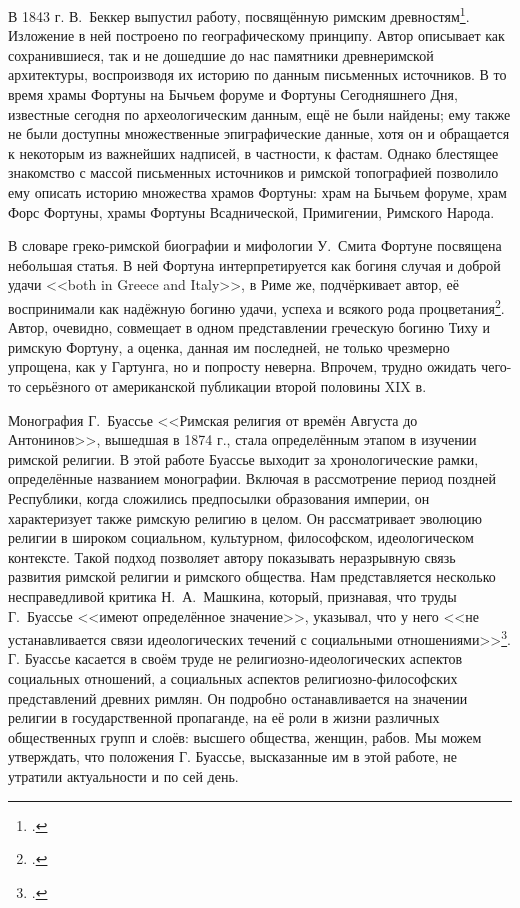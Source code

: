 В 1843 г. В.~Беккер выпустил работу, посвящённую римским древностям\footcite{Becker1843I}. Изложение в ней построено по географическому принципу. Автор описывает как сохранившиеся, так и не дошедшие до нас памятники древнеримской архитектуры, воспроизводя их историю по данным письменных источников. В то время храмы Фортуны на Бычьем форуме и Фортуны Сегодняшнего Дня, известные сегодня по археологическим данным, ещё не были найдены; ему также не были доступны множественные эпиграфические данные, хотя он и обращается к некоторым из важнейших надписей, в частности, к фастам. Однако блестящее знакомство с массой письменных источников и римской топографией позволило ему описать историю множества храмов Фортуны: храм на Бычьем форуме, храм Форс Фортуны, храмы Фортуны Всаднической, Примигении, Римского Народа.


В словаре греко-римской биографии и мифологии У.~Смита Фортуне посвящена небольшая статья. В ней Фортуна интерпретируется как богиня случая и доброй удачи <<both in Greece and Italy>>, в Риме же, подчёркивает автор, её воспринимали как надёжную богиню удачи, успеха и всякого рода процветания\footcite[P. 180]{FortunaSmith1867}. Автор, очевидно, совмещает в одном представлении греческую богиню Тиху и римскую Фортуну, а оценка, данная им последней, не только чрезмерно упрощена, как у Гартунга, но и попросту неверна. Впрочем, трудно ожидать чего-то серьёзного от американской публикации второй половины XIX в.


Монография Г.~Буассье <<Римская религия от времён Августа до Антонинов>>, вышедшая в 1874 г., стала определённым этапом в изучении римской религии. В этой работе Буассье выходит за хронологические рамки, определённые названием монографии. Включая в рассмотрение период поздней Республики, когда сложились предпосылки образования империи, он характеризует также римскую религию в целом. Он рассматривает эволюцию религии в широком социальном, культурном, философском, идеологическом контексте. Такой подход позволяет автору показывать неразрывную связь развития римской религии и римского общества. Нам представляется несколько несправедливой критика Н.~А.~Машкина, который, признавая, что труды Г.~Буассье <<имеют определённое значение>>, указывал, что у него <<не устанавливается связи идеологических течений с социальными отношениями>>\footcite[С. 350]{Mashkin1949}. Г. Буассье касается в своём труде не религиозно-идеологических аспектов социальных отношений, а социальных аспектов религиозно-философских представлений древних римлян. Он подробно останавливается на значении религии в государственной пропаганде, на её роли в жизни различных общественных групп и слоёв: высшего общества, женщин, рабов. Мы можем утверждать, что положения Г. Буассье, высказанные им в этой работе, не утратили актуальности и по сей день.


